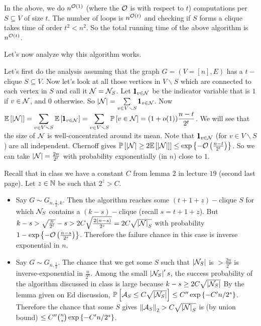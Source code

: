 In the above, we do $n^{{\mathcal{O}}(1)}$ (where the ${\mathcal{O}}$ is with respect to $t$) computations per $S\subseteq V$ of size $t$. The number of loops is $n^{{\mathcal{O}}(t)}$ and checking if $S$ forms a clique takes time of order $t^{2} < n^{2}$. So the total running time of the above algorithm is $n^{{\mathcal{O}}(t)}$.



Let's now analyze why this algorithm works.


Let's first do the analysis assuming that the graph $G=(V=[n],E)$ has a $t-$ clique $S\subseteq V$. Now let's look at all those vertices in $V\smallsetminus S$ which are connected to each vertex in $S$ and call it ${\mathcal{N}}={\mathcal{N}}_{S}$. Let $\pmb 1_{v\in {\mathcal{N}}}$ be the indicator variable that is $1$ if $v\in {\mathcal{N}}$, and $0$ otherwise. So $\left| {\mathcal{N}} \right| = \sum\limits_{v\in V\smallsetminus S}\pmb 1_{v\in{\mathcal{N}}}$. Now $\displaystyle \mathbb E\left[ \left| {\mathcal{N}} \right| \right] = \sum_{v\in V\smallsetminus S} \mathbb E\left[ \pmb 1_{v\in{\mathcal{N}}} \right] = \sum_{v\in V\smallsetminus S} \mathbb P\left[ v\in{\mathcal{N}} \right] = (1+o(1))\frac{n-t}{2^{t}}$. We will see that the size of ${\mathcal{N}}$ is well-concentrated around its mean. Note that $\pmb 1_{v\in{\mathcal{N}}}$ (for $v\in V\smallsetminus S$) are all independent. Chernoff gives $\mathbb P\left[ \left| {\mathcal{N}} \right| \ge 2\mathbb E\left[ \left| {\mathcal{N}} \right| \right]  \right] \le \exp\left\{-{\mathcal{O}}\left(\frac{n-t}{2^{t}}\right)\right\}$. So we can take $\left| {\mathcal{N}} \right| = \frac{2n}{2^{t}}$ with probability exponentially (in $n$) close to $1$.

Recall that in class we have a constant $C$ from lemma $2$ in lecture $19$ (second last page). Let $z\in\mathbb{N}$ be such that $2^{z}>C$.


\begin{itemize}
\item Say $G\sim G_{n,\frac12,k}$. Then the algorithm reaches some $(t+1+z)-$clique $S$ for which ${\mathcal{N}}_{S}$ contains a $(k-s)-$clique (recall $s=t+1+z$). But $k-s > \sqrt{\frac n{2^{t}}}-s > 2C\sqrt{\frac{2(n-s)}{2^{s}}} = 2C\sqrt{\left| {\mathcal{N}} \right|_{S}}$ with probability $1-\exp\left\{-{\mathcal{O}}\left(\frac{n-s}{2^{s}}\right)\right\}$. Therefore the failure chance in this case is inverse exponential in $n$.
\item Say $G\sim G_{n,\frac12}$. The chance that we get some $S$ such that $\left| {\mathcal{N}}_{S} \right|$ is $>\frac{2n}{2^{s}}$ is inverse-exponential in $\frac{n}{2^{s}}$. Among the small $\left| {\mathcal{N}}_{S} \right|'s$, the success probability of the algorithm discussed in class is large because $k-s \ge 2C\sqrt{\left| {\mathcal{N}}_{S} \right|}$ By the lemma given on Ed discussion, $\mathbb P\left[ {\mathcal{A}}_{S} \le C\sqrt{\left| {\mathcal{N}}_{S} \right|} \right] \le C''\exp\left\{-C'n/2^{s}\right\}$. Therefore the chance that some $S$ gives $\left\lVert {\mathcal{A}}_{S} \right\rVert_{2} > C\sqrt{\left| {\mathcal{N}} \right|_{S}}$ is (by union bound) $\le C''{n\choose s} \exp\left\{-C'n/2^{s}\right\}$. 
\end{itemize}









